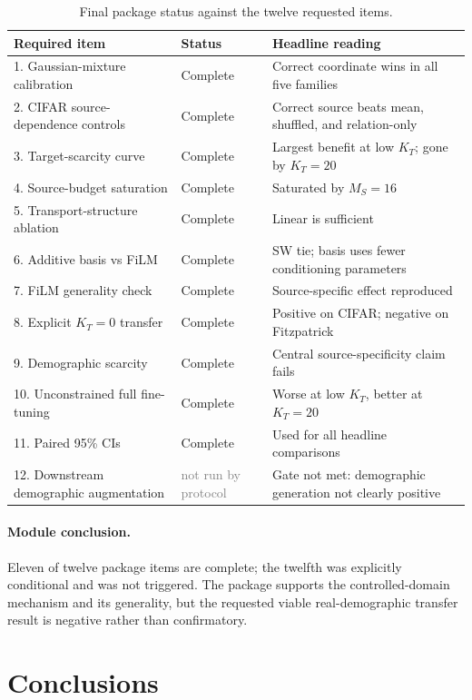 \documentclass{article}
\newcommand{\KT}{K_T}
\newcommand{\MS}{M_S}
\newcommand{\notrun}{\textcolor{gray}{not run by protocol}}
\begin{document}
\begin{table}[h]
\caption{Final package status against the twelve requested items.}
\label{tab:package}
\centering
\scriptsize
\begin{tabular}{p{}p{}p{}}
\toprule
Required item & Status & Headline reading \\
\midrule
1. Gaussian-mixture calibration & Complete & Correct coordinate wins in all five families \\
2. CIFAR source-dependence controls & Complete & Correct source beats mean, shuffled, and relation-only \\
3. Target-scarcity curve & Complete & Largest benefit at low $\KT$; gone by $\KT=20$ \\
4. Source-budget saturation & Complete & Saturated by $\MS=16$ \\
5. Transport-structure ablation & Complete & Linear is sufficient \\
6. Additive basis vs FiLM & Complete & SW tie; basis uses fewer conditioning parameters \\
7. FiLM generality check & Complete & Source-specific effect reproduced \\
8. Explicit $\KT=0$ transfer & Complete & Positive on CIFAR; negative on Fitzpatrick \\
9. Demographic scarcity & Complete & Central source-specificity claim fails \\
10. Unconstrained full fine-tuning & Complete & Worse at low $\KT$, better at $\KT=20$ \\
11. Paired 95\% CIs & Complete & Used for all headline comparisons \\
12. Downstream demographic augmentation & \notrun & Gate not met: demographic generation not clearly positive \\
\bottomrule
\end{tabular}
\end{table}

\paragraph{Module conclusion.}
Eleven of twelve package items are complete; the twelfth was explicitly conditional and was not triggered. The package supports the controlled-domain mechanism and its generality, but the requested viable real-demographic transfer result is negative rather than confirmatory.

\section{Conclusions}
\end{document}
